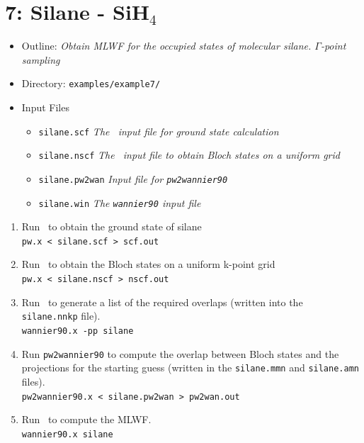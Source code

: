 \documentclass[a4paper,11pt,twoside]{article}
\begin{document}

\cleardoublepage

\section*{7: Silane - SiH$_4$}
\begin{itemize}
\item{Outline: \it{Obtain MLWF for the occupied states of molecular
    silane. $\Gamma$-point sampling}} 
\item{Directory: {\tt examples/example7/}}
\item{Input Files}
\begin{itemize}
\item{ {\tt silane.scf}  {\it The \pwscf\ input file for ground state
    calculation}} 
\item{ {\tt silane.nscf}  {\it The \pwscf\ input file to obtain Bloch states
    on a uniform grid}} 
\item{ {\tt silane.pw2wan}  {\it Input file for {\tt pw2wannier90}}}
\item{ {\tt silane.win}  {\it The {\tt wannier90} input file}}
\end{itemize}
\end{itemize}

\begin{enumerate}
\item Run \pwscf\ to obtain the ground state of silane\\
{\tt pw.x < silane.scf > scf.out}

\item Run \pwscf\ to obtain the Bloch states on a uniform k-point grid\\
{\tt pw.x < silane.nscf > nscf.out}

\item Run \wannier\ to generate a list of the required overlaps (written
  into the {\tt silane.nnkp} file).\\ 
{\tt wannier90.x -pp silane}

\item Run {\tt pw2wannier90} to compute the overlap between Bloch
  states and the projections for the starting guess (written in the
  {\tt silane.mmn} and {\tt silane.amn} files).\\  
{\tt pw2wannier90.x < silane.pw2wan > pw2wan.out}

\item Run \wannier\ to compute the MLWF.\\
{\tt wannier90.x silane}
\end{enumerate}
\end{document}
